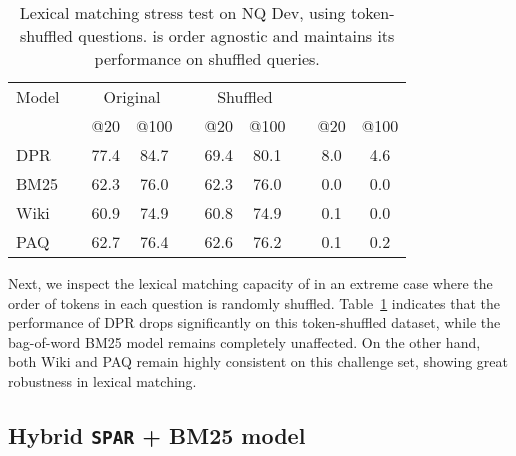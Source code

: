 \documentclass[11pt]{article}
\newcommand{\spar}{\texttt{SPAR}\xspace}
\newcommand{\lexmodelsymbol}{\xspace}
\begin{document}
\begin{table}[ht]
    \small
    \setlength{\tabcolsep}{0.4em}
    \centering
    \begin{tabular}{l c cc c cc c cc}
    \toprule
    Model   && \multicolumn{2}{c}{Original} && \multicolumn{2}{c}{Shuffled} && \multicolumn{2}{c}{}\\
    \cmidrule{3-4}\cmidrule{6-7}\cmidrule{9-10}
            && @20 & @100 && @20 & @100 && @20 & @100 \\
    \midrule
    DPR     && 77.4 & 84.7 && 69.4 & 80.1 && 8.0 & 4.6 \\
    BM25    && 62.3 & 76.0 && 62.3 & 76.0 && 0.0 & 0.0 \\
    Wiki \lexmodelsymbol{} && 60.9 & 74.9 && 60.8 & 74.9 && 0.1 & 0.0 \\
    PAQ \lexmodelsymbol{} && 62.7 & 76.4 && 62.6 & 76.2 && 0.1 & 0.2 \\
    \bottomrule
    \end{tabular}
    \caption{Lexical matching stress test on NQ Dev, using token-shuffled questions. \lexmodelsymbol{} is order agnostic and maintains its performance on shuffled queries.}
    \label{tab:nq_shuffled}
\end{table}
 
Next, we inspect the lexical matching capacity of \lexmodelsymbol{} in an extreme case where the order of tokens in each question is randomly shuffled.
Table~\ref{tab:nq_shuffled} indicates that the performance of DPR drops significantly on this token-shuffled dataset, while the bag-of-word BM25 model remains completely unaffected.
On the other hand, both Wiki \lexmodelsymbol{} and PAQ \lexmodelsymbol{} remain highly consistent on this challenge set, showing great robustness in lexical matching.


\subsection{Hybrid \spar{} + BM25 model}
\end{document}

